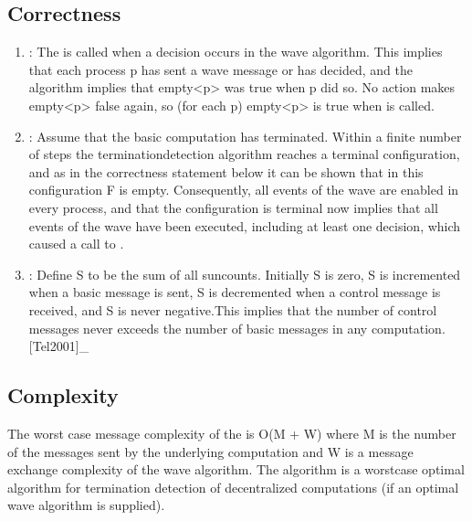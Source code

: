 \documentclass[letterpaper,10pt,english]{sphinxmanual}
\begin{document}
\subsection{Correctness}
\label{\detokenize{docs/ShavitFranchezAlg/algorithm:correctness}}\begin{enumerate}
%
\item {} 
\sphinxAtStartPar
{}: The  is called when a decision occurs in the wave algorithm. This implies that each process p has sent a wave message or has decided, and the algorithm implies that empty\textless{}p\textgreater{} was true when p did so. No action makes empty\textless{}p\textgreater{} false again, so (for each p) empty\textless{}p\textgreater{} is true when  is called. 

\item {} 
\sphinxAtStartPar
{}: Assume that the basic computation has terminated. Within a finite number of steps the termination\sphinxhyphen{}detection algorithm reaches a terminal configuration, and as in the correctness statement below it can be shown that in this configuration F is empty. Consequently, all events of the wave are enabled in every process, and that the configuration is terminal now implies that all events of the wave have been executed, including at least one decision, which caused a call to . 

\item {} 
\sphinxAtStartPar
{}: Define S to be the sum of all sun\sphinxhyphen{}counts. Initially S is zero, S is incremented when a basic message is sent, S is decremented when a control message is received, and S is never negative.This implies that the number of control messages never exceeds the number of basic messages in any computation.{[}Tel2001{]}\_

\end{enumerate}


\subsection{Complexity}
\label{\detokenize{docs/ShavitFranchezAlg/algorithm:complexity}}
\sphinxAtStartPar
The worst case message complexity of the {\hyperref[\detokenize{docs/ShavitFranchezAlg/algorithm:shavitfranchesterminationdetectionalgorithm}]{}} is O(M + W) where M is the number of the messages sent by the underlying computation and W is a message exchange complexity of the wave algorithm. The algorithm is a worst\sphinxhyphen{}case optimal algorithm for termination detection of decentralized computations (if an optimal wave algorithm is supplied). 
\end{document}
